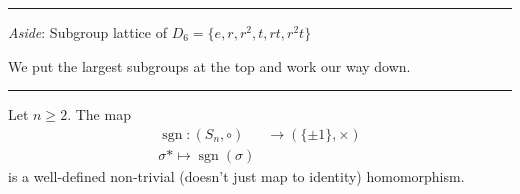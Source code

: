\begin{center}\rule{\linewidth}{0.5pt}\end{center}

\emph{Aside}: Subgroup lattice of \(D_6 = \{ e, r, r^2, t, rt, r^2t \}\)

\begin{center}
\end{center}

We put the largest subgroups at the top and work our way down.

\begin{center}\rule{\linewidth}{0.5pt}\end{center}

\begin{theorem}
\protect\hypertarget{thm:two}{}\label{thm:two}Let \(n \geq 2\).
The map
\begin{align*}
    \operatorname{sgn} : (S_n, \circ) &\to \left( \{ \pm 1 \}, \times \right) \\
    \sigma *\mapsto \operatorname{sgn}(\sigma)
\end{align*}
is a well-defined non-trivial (doesn't just map to identity) homomorphism.
\end{theorem}

